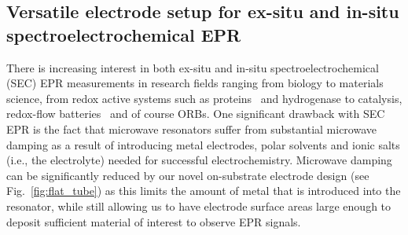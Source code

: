 \subsection{Versatile electrode setup for ex-situ and in-situ spectroelectrochemical EPR}
\label{electrode_setup}
%
There is increasing interest in both ex-situ and in-situ spectroelectrochemical (SEC) EPR measurements in research fields ranging from biology to materials science, from redox active systems such as proteins~\cite{abdiaziz2019_chemcomm} and hydrogenase to catalysis,\cite{kutin2019_catalysis, neukermans2020_chemelectrochem, bonke2021_natrev, priebe2013_angewandte, rabeah2015_angewandte} redox-flow batteries~\cite{zhao2021_jacs} and of course ORBs.\cite{huang2016_jpowersources, kanzaki2018_acsappmat} One significant drawback with SEC EPR is the fact that microwave resonators suffer from substantial microwave damping as a result of introducing metal electrodes, polar solvents and ionic salts (i.e., the electrolyte) needed for successful electrochemistry.\cite{wadhawan2007_encofelectrochem} Microwave damping can be significantly reduced by our novel on-substrate electrode design (see Fig.~\ref{fig:flat_tube}) as this limits the amount of metal that is introduced into the resonator, while still allowing us to have electrode surface areas large enough to deposit sufficient material of interest to observe EPR signals.

